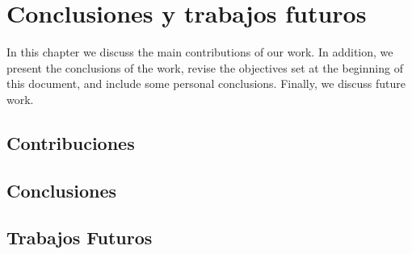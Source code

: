\chead[]{}
\renewcommand{\headrulewidth}{0.5pt}

\lfoot[]{}
\cfoot[]{}
\rfoot[]{}
\renewcommand{\footrulewidth}{0pt}

\chapter{Conclusiones y trabajos futuros}
\label{ch:conclusions_and_future_work}

In this chapter we discuss the main contributions of our work. In addition, we present the conclusions of the work, revise the objectives set at the beginning of this document, and include some personal conclusions. Finally, we discuss future work.

\section{Contribuciones}



\section{Conclusiones}




\section{Trabajos Futuros}



